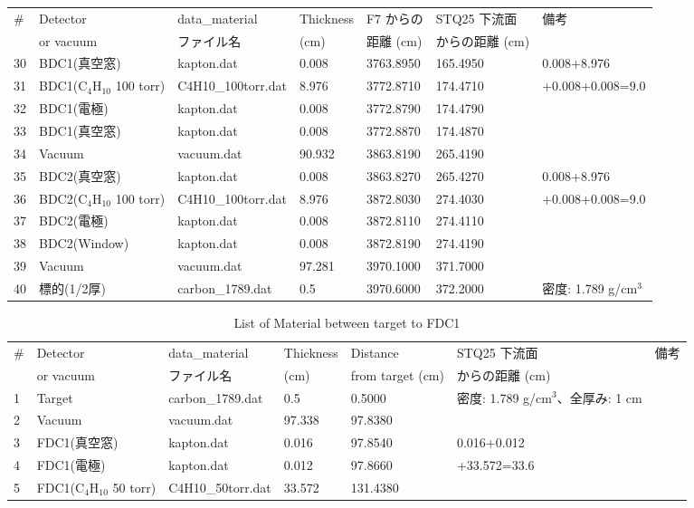 \begin{table}
    \centering
    \begin{tabular}{lllllll} \\ \hline
        \# & Detector   & data\_material & Thickness & F7 からの & STQ25 下流面 & 備考    \\
           & or vacuum  & ファイル名        & (cm)      & 距離 (cm) & からの距離 (cm) & \\
        \hline
    30 & BDC1(真空窓) & kapton.dat & 0.008 & 3763.8950 & 165.4950 &
    0.008+8.976 \\
    31 & BDC1(C$_4$H$_{10}$ 100 torr) & C4H10\_100torr.dat & 8.976 &
    3772.8710 & 174.4710 &
    +0.008+0.008=9.0  \\
    32 & BDC1(電極) & kapton.dat & 0.008 & 3772.8790 & 174.4790 &    \\
    33 & BDC1(真空窓)& kapton.dat & 0.008 & 3772.8870 & 174.4870 & \\
    \hline
    34 & Vacuum     & vacuum.dat &90.932 & 3863.8190 & 265.4190 & \\
    \hline
    35 & BDC2(真空窓) & kapton.dat & 0.008 & 3863.8270 & 265.4270 &
    0.008+8.976 \\
    36 & BDC2(C$_4$H$_{10}$ 100 torr) & C4H10\_100torr.dat & 8.976 &
    3872.8030 & 274.4030 &
    +0.008+0.008=9.0 \\
    37 & BDC2(電極)& kapton.dat & 0.008 & 3872.8110 & 274.4110 &    \\
    38 & BDC2(Window) & kapton.dat & 0.008 & 3872.8190 & 274.4190 & \\
    \hline
    39 & Vacuum    & vacuum.dat &97.281 & 3970.1000 & 371.7000 & \\
    \hline
    40 & 標的(1/2厚)  & carbon\_1789.dat & 0.5 & 3970.6000 & 372.2000 & 密度: 1.789 g/cm$^3$ \\ \hline
    \end{tabular}
\end{table}

\begin{table}
    \centering
    \begin{tabular}{lllllll} \\ \hline
    \# & Detector   & data\_material & Thickness & Distance & STQ25 下流面 & 備考    \\
       & or vacuum  & ファイル名        & (cm)      & from target (cm) & からの距離 (cm) & \\
    \hline
    1 & Target      & carbon\_1789.dat & 0.5 & 0.5000 & 密度: 1.789 g/cm$^3$、全厚み: 1 cm \\ \hline
    2 & Vacuum      & vacuum.dat  & 97.338   & 97.8380  & \\ \hline
    3 & FDC1(真空窓) & kapton.dat & 0.016    & 97.8540  & 0.016+0.012 \\
    4 & FDC1(電極)   & kapton.dat & 0.012    & 97.8660  & +33.572=33.6\\
    5 & FDC1(C$_4$H$_{10}$ 50 torr) & C4H10\_50torr.dat & 33.572 & 131.4380 &  \\
    \hline
    \end{tabular}
    \caption{List of Material between target to FDC1}
\end{table}


